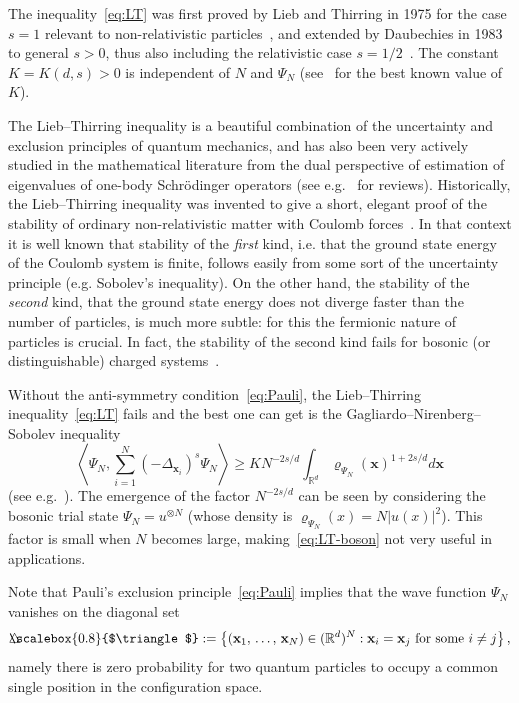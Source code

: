 \documentclass[10pt]{amsart}
\theoremstyle{definition}\newtheorem{defi}[theo]{Definition}\newtheorem{rema}[theo]{Remark}\newtheorem{exam}[theo]{Example}\newtheorem{exem}[theo]{Example}\newtheorem{nota}[theo]{Notation}
\newcommand*\R {\mathbb{R}}
\newcommand\1{{\ensuremath {\mathds 1} }}
\newcommand{\bx}{\mathbf{x}}
\newcommand{\bDelta}{{\mbox{$\triangle$}\hspace{-8.6pt}\scalebox{0.8}{$\triangle$}}}
\begin{document}
The inequality~\eqref{eq:LT} was first proved by Lieb and Thirring in 1975 for the case $s=1$ relevant to non-relativistic particles~\cite{LieThi-75,LieThi-76}, and extended by Daubechies in 1983 to general $s>0$, thus also including the relativistic case $s=1/2$~\cite{Daubechies-83}. The constant $K=K(d,s)>0$ is independent of $N$ and $\Psi_N$ (see~\cite{FraHunJexNam-18} for the best known value of $K$).

The Lieb--Thirring inequality is a beautiful combination of the uncertainty and exclusion principles of quantum mechanics, and has also been very actively studied in the mathematical literature from the dual perspective of estimation of eigenvalues of one-body Schr\"odinger operators (see e.g.~\cite{Laptev-12,LieSei-09} for reviews). Historically, the Lieb--Thirring inequality was invented to give a short, elegant proof of the stability of ordinary non-relativistic matter with Coulomb forces~\cite{LieThi-75}. In that context it is well known that stability of the \emph{first} kind, i.e. that the ground state energy of the Coulomb system is finite, follows easily from some sort of the uncertainty principle (e.g. Sobolev's inequality). On the other hand, the stability of the \emph{second} kind, that the ground state energy does not diverge faster than the number of particles, is much more subtle: for this the fermionic nature of particles is crucial. In fact, the stability of the second kind fails for bosonic (or distinguishable) charged systems~\cite{Dyson-67}.

Without the anti-symmetry condition~\eqref{eq:Pauli}, the Lieb--Thirring inequality~\eqref{eq:LT} fails and the best one can get is the Gagliardo--Nirenberg--Sobolev inequality
\begin{equation}\label{eq:LT-boson}
\left\langle \Psi_N, \sum_{i=1}^N (-\Delta_{\bx_i})^s \Psi_N\right\rangle \ge K N^{-2s/d} \int_{\R^d} \varrho_{\Psi_N}(\bx)^{1+2s/d} d\bx
\end{equation}
(see e.g.~\cite{LunNamPor-16}). The emergence of the factor $N^{-2s/d}$ can be seen by considering the bosonic trial state $\Psi_N=u^{\otimes N}$ (whose density is $\varrho_{\Psi_N}(x)=N|u(x)|^2$). This factor is small when $N$ becomes large, making~\eqref{eq:LT-boson} not very useful in applications.

Note that Pauli's exclusion principle~\eqref{eq:Pauli} implies that the wave function $\Psi_N$ vanishes on the diagonal set
\begin{equation}\label{eq:diagonal}
\bDelta := \left\{(\bx_1,\,\ldots,\,\bx_N) \in (\R^d)^{N}: \bx_i=\bx_j \text{ for some } i\neq j \right\},
\end{equation}
namely there is zero probability for two quantum particles to occupy a common single position in the configuration space.
\end{document}
